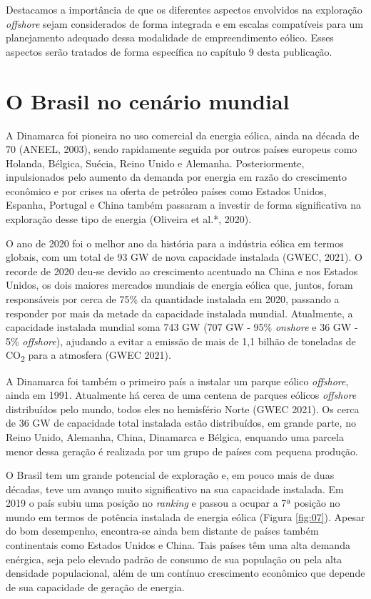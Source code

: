 \documentclass[
  oneside]{scrbook}
\begin{document}
Destacamos a importância de que os diferentes aspectos envolvidos na exploração \emph{offshore} sejam considerados de forma integrada e em escalas compatíveis para um planejamento adequado dessa modalidade de empreendimento eólico. Esses aspectos serão tratados de forma específica no capítulo 9 desta publicação.

\hypertarget{o-brasil-no-cenuxe1rio-mundial}{%
\section{O Brasil no cenário mundial}\label{o-brasil-no-cenuxe1rio-mundial}}

A Dinamarca foi pioneira no uso comercial da energia eólica, ainda na década de 70 (ANEEL, 2003), sendo rapidamente seguida por outros países europeus como Holanda, Bélgica, Suécia, Reino Unido e Alemanha. Posteriormente, inpulsionados pelo aumento da demanda por energia em razão do crescimento econômico e por crises na oferta de petróleo países como Estados Unidos, Espanha, Portugal e China também passaram a investir de forma significativa na exploração desse tipo de energia (Oliveira et al.*, 2020).

O ano de 2020 foi o melhor ano da história para a indústria eólica em termos globais, com um total de 93 GW de nova capacidade instalada (GWEC, 2021). O recorde de 2020 deu-se devido ao crescimento acentuado na China e nos Estados Unidos, os dois maiores mercados mundiais de energia eólica que, juntos, foram responsáveis por cerca de 75\% da quantidade instalada em 2020, passando a responder por mais da metade da capacidade instalada mundial. Atualmente, a capacidade instalada mundial soma 743 GW (707 GW - 95\% \emph{onshore} e 36 GW - 5\% \emph{offshore}), ajudando a evitar a emissão de mais de 1,1 bilhão de toneladas de CO\textsubscript{2} para a atmosfera (GWEC 2021).

A Dinamarca foi também o primeiro país a instalar um parque eólico \emph{offshore}, ainda em 1991. Atualmente há cerca de uma centena de parques eólicos \emph{offshore} distribuídos pelo mundo, todos eles no hemisfério Norte (GWEC 2021). Os cerca de 36 GW de capacidade total instalada estão distribuídos, em grande parte, no Reino Unido, Alemanha, China, Dinamarca e Bélgica, enquando uma parcela menor dessa geração é realizada por um grupo de países com pequena produção.

O Brasil tem um grande potencial de exploração e, em pouco mais de duas décadas, teve um avanço muito significativo na sua capacidade instalada. Em 2019 o país subiu uma posição no \emph{ranking} e passou a ocupar a 7ª posição no mundo em termos de potência instalada de energia eólica (Figura \ref{fig:07}). Apesar do bom desempenho, encontra-se ainda bem distante de países também continentais como Estados Unidos e China. Tais países têm uma alta demanda enérgica, seja pelo elevado padrão de consumo de sua população ou pela alta densidade populacional, além de um contínuo crescimento econômico que depende de sua capacidade de geração de energia.
\end{document}
